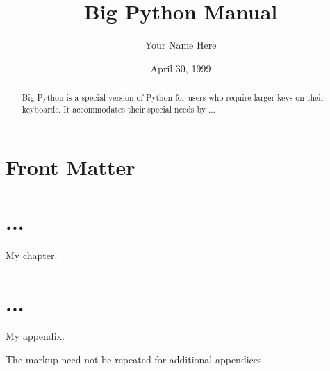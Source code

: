 \documentclass{manual}
\title{Big Python Manual}
\author{Your Name Here}
\date{April 30, 1999}		%
\begin{document}
\maketitle

\ifhtml
\chapter*{Front Matter\label{front}}
\fi

%

\begin{abstract}

\noindent
Big Python is a special version of Python for users who require larger 
keys on their keyboards.  It accommodates their special needs by ...

\end{abstract}

\tableofcontents


\chapter{...}

My chapter.


\appendix
\chapter{...}

My appendix.

The  markup need not be repeated for additional
appendices.


%
%
%
\renewcommand{\indexname}{Module Index}

\renewcommand{\indexname}{Index}
\end{document}
